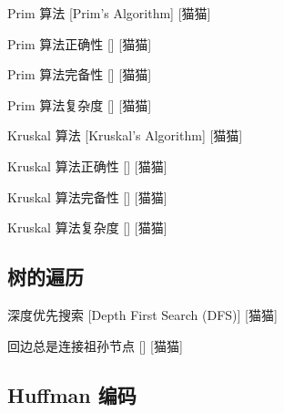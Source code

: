 \documentclass[UTF8]{ctexart}
\begin{document}
            \begin{dfn}
                []
                {Prim 算法}
                [Prim's Algorithm]
                [猫猫]
            \end{dfn}
            
            \begin{ppt}
                []
                {Prim 算法正确性}
                []
                [猫猫]
            \end{ppt}
            
            \begin{ppt}
                []
                {Prim 算法完备性}
                []
                [猫猫]
            \end{ppt}
            
            \begin{ppt}
                []
                {Prim 算法复杂度}
                []
                [猫猫]
            \end{ppt}
            
            \begin{dfn}
                []
                {Kruskal 算法}
                [Kruskal's Algorithm]
                [猫猫]
            \end{dfn}

            \begin{ppt}
                []
                {Kruskal 算法正确性}
                []
                [猫猫]
            \end{ppt}

            \begin{ppt}
                []
                {Kruskal 算法完备性}
                []
                [猫猫]
            \end{ppt}

            \begin{ppt}
                []
                {Kruskal 算法复杂度}
                []
                [猫猫]
            \end{ppt}

        \subsection{树的遍历}
            
            \begin{dfn}
                []
                {深度优先搜索}
                [Depth First Search (DFS)]
                [猫猫]
            \end{dfn}
            
            \begin{ppt}
                []
                {回边总是连接祖孙节点}
                []
                [猫猫]
            \end{ppt}

        \subsection{Huffman 编码}
            
\end{document}
